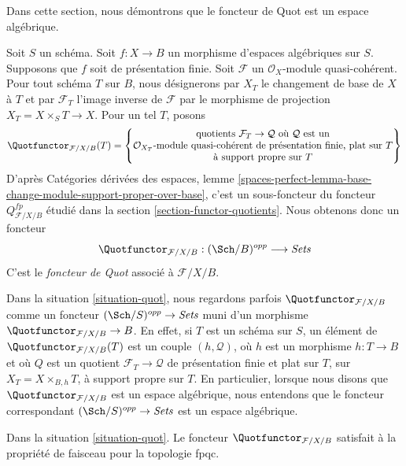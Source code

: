 \noindent
Dans cette section, nous démontrons que le foncteur de Quot est un espace
algébrique.

\begin{situation}
\label{situation-quot}
Soit $S$ un schéma. Soit $f : X \to B$ un morphisme d'espaces algébriques sur
$S$. Supposons que $f$ soit de présentation finie. Soit $\mathcal{F}$ un
$\mathcal{O}_X$-module quasi-cohérent. Pour tout schéma $T$ sur $B$, nous
désignerons par $X_T$ le changement de base de $X$ à $T$ et par
$\mathcal{F}_T$ l'image inverse de $\mathcal{F}$ par le morphisme de
projection $X_T = X \times_S T \to X$. Pour un tel $T$, posons
$$
\Quotfunctor_{\mathcal{F}/X/B}(T) =
\left\{
\begin{matrix}
\text{quotients }\mathcal{F}_T \to \mathcal{Q}\text{ où }
\mathcal{Q}\text{ est un}\\
\mathcal{O}_{X_T}\text{-module quasi-cohérent de présentation finie, plat sur }T\\
\text{à support propre sur }T
\end{matrix}
\right\}
$$
D'après Catégories dérivées des espaces, lemme
\ref{spaces-perfect-lemma-base-change-module-support-proper-over-base}, c'est
un sous-foncteur du foncteur $Q^{fp}_{\mathcal{F}/X/B}$ étudié dans la section
\ref{section-functor-quotients}. Nous obtenons donc un foncteur
\begin{equation}
\label{equation-quot}
\Quotfunctor_{\mathcal{F}/X/B} : (\Sch/B)^{opp} \longrightarrow \textit{Sets}
\end{equation}
C'est le {\it foncteur de Quot} associé à $\mathcal{F}/X/B$.
\end{situation}

\noindent
Dans la situation \ref{situation-quot}, nous regardons parfois
$\Quotfunctor_{\mathcal{F}/X/B}$ comme un foncteur
$(\Sch/S)^{opp} \to \textit{Sets}$ muni d'un morphisme
$\Quotfunctor_{\mathcal{F}/X/B} \to B$. En effet, si $T$ est un schéma sur
$S$, un élément de $\Quotfunctor_{\mathcal{F}/X/B}(T)$ est un couple
$(h, \mathcal{Q})$, où $h$ est un morphisme $h : T \to B$ et où $Q$ est un
quotient $\mathcal{F}_T \to \mathcal{Q}$ de présentation finie et plat sur
$T$, sur $X_T = X \times_{B, h} T$, à support propre sur $T$. En particulier,
lorsque nous disons que $\Quotfunctor_{\mathcal{F}/X/B}$ est un espace
algébrique, nous entendons que le foncteur correspondant
$(\Sch/S)^{opp} \to \textit{Sets}$ est un espace algébrique.

\begin{lemma}
\label{lemma-quot-sheaf}
Dans la situation \ref{situation-quot}. Le foncteur
$\Quotfunctor_{\mathcal{F}/X/B}$ satisfait à la propriété de faisceau pour la
topologie fpqc.
\end{lemma}

